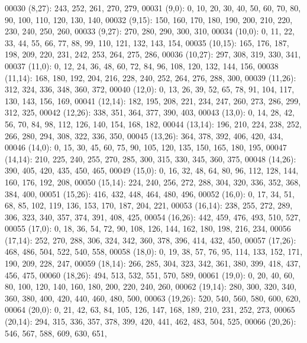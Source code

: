 \begin{DoxyCode}
00030       (8,27): 243, 252, 261, 270, 279,
00031       (9,0): 0, 10, 20, 30, 40, 50, 60, 70, 80, 90, 100, 110, 120, 130, 140,
00032       (9,15): 150, 160, 170, 180, 190, 200, 210, 220, 230, 240, 250, 260,
00033       (9,27): 270, 280, 290, 300, 310,
00034       (10,0): 0, 11, 22, 33, 44, 55, 66, 77, 88, 99, 110, 121, 132, 143, 154,
00035       (10,15): 165, 176, 187, 198, 209, 220, 231, 242, 253, 264, 275, 286,
00036       (10,27): 297, 308, 319, 330, 341,
00037       (11,0): 0, 12, 24, 36, 48, 60, 72, 84, 96, 108, 120, 132, 144, 156,
00038       (11,14): 168, 180, 192, 204, 216, 228, 240, 252, 264, 276, 288, 300,
00039       (11,26): 312, 324, 336, 348, 360, 372,
00040       (12,0): 0, 13, 26, 39, 52, 65, 78, 91, 104, 117, 130, 143, 156, 169,
00041       (12,14): 182, 195, 208, 221, 234, 247, 260, 273, 286, 299, 312, 325,
00042       (12,26): 338, 351, 364, 377, 390, 403,
00043       (13,0): 0, 14, 28, 42, 56, 70, 84, 98, 112, 126, 140, 154, 168, 182,
00044       (13,14): 196, 210, 224, 238, 252, 266, 280, 294, 308, 322, 336, 350,
00045       (13,26): 364, 378, 392, 406, 420, 434,
00046       (14,0): 0, 15, 30, 45, 60, 75, 90, 105, 120, 135, 150, 165, 180, 195,
00047       (14,14): 210, 225, 240, 255, 270, 285, 300, 315, 330, 345, 360, 375,
00048       (14,26): 390, 405, 420, 435, 450, 465,
00049       (15,0): 0, 16, 32, 48, 64, 80, 96, 112, 128, 144, 160, 176, 192, 208,
00050       (15,14): 224, 240, 256, 272, 288, 304, 320, 336, 352, 368, 384, 400,
00051       (15,26): 416, 432, 448, 464, 480, 496,
00052       (16,0): 0, 17, 34, 51, 68, 85, 102, 119, 136, 153, 170, 187, 204, 221,
00053       (16,14): 238, 255, 272, 289, 306, 323, 340, 357, 374, 391, 408, 425,
00054       (16,26): 442, 459, 476, 493, 510, 527,
00055       (17,0): 0, 18, 36, 54, 72, 90, 108, 126, 144, 162, 180, 198, 216, 234,
00056       (17,14): 252, 270, 288, 306, 324, 342, 360, 378, 396, 414, 432, 450,
00057       (17,26): 468, 486, 504, 522, 540, 558,
00058       (18,0): 0, 19, 38, 57, 76, 95, 114, 133, 152, 171, 190, 209, 228, 247,
00059       (18,14): 266, 285, 304, 323, 342, 361, 380, 399, 418, 437, 456, 475,
00060       (18,26): 494, 513, 532, 551, 570, 589,
00061       (19,0): 0, 20, 40, 60, 80, 100, 120, 140, 160, 180, 200, 220, 240, 260,
00062       (19,14): 280, 300, 320, 340, 360, 380, 400, 420, 440, 460, 480, 500,
00063       (19,26): 520, 540, 560, 580, 600, 620,
00064       (20,0): 0, 21, 42, 63, 84, 105, 126, 147, 168, 189, 210, 231, 252, 273,
00065       (20,14): 294, 315, 336, 357, 378, 399, 420, 441, 462, 483, 504, 525,
00066       (20,26): 546, 567, 588, 609, 630, 651,

\end{DoxyCode}
